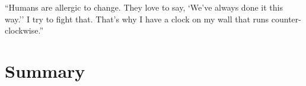 \begin{savequote}[75mm]
``Humans are allergic to change. They love to say, `We've always done it this way.'' I try to fight that. That's why I have a clock on my wall that runs counter-clockwise.''
\end{savequote}

\chapter{Summary}\label{summary}
\setcounter{figure}{-1}
\setcounter{table}{-1}
\setcounter{section}{-1}
\setcounter{NAT@ctr}{-1}

